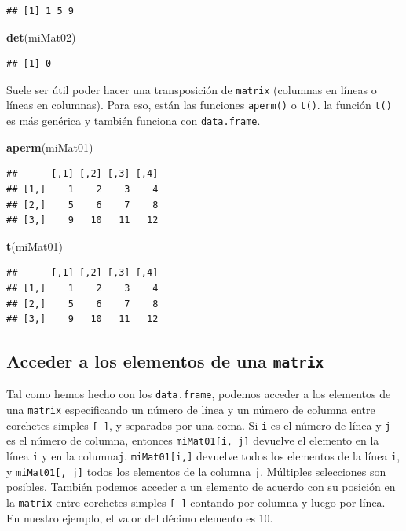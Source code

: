 \documentclass[]{book}
\newenvironment{Shaded}{\begin{snugshade}}{\end{snugshade}}
\newcommand{\KeywordTok}[1]{\textcolor[rgb]{0.13,0.29,0.53}{\textbf{#1}}}
\newcommand{\NormalTok}[1]{#1}
\begin{document}
\begin{verbatim}
## [1] 1 5 9
\end{verbatim}

\begin{Shaded}
\begin{Highlighting}[]
\KeywordTok{det}\NormalTok{(miMat02)}
\end{Highlighting}
\end{Shaded}

\begin{verbatim}
## [1] 0
\end{verbatim}

Suele ser útil poder hacer una transposición de \texttt{matrix}
(columnas en líneas o líneas en columnas). Para eso, están las funciones
\texttt{aperm()} o \texttt{t()}. la función \texttt{t()} es más genérica
y también funciona con \texttt{data.frame}.

\begin{Shaded}
\begin{Highlighting}[]
\KeywordTok{aperm}\NormalTok{(miMat01)}
\end{Highlighting}
\end{Shaded}

\begin{verbatim}
##      [,1] [,2] [,3] [,4]
## [1,]    1    2    3    4
## [2,]    5    6    7    8
## [3,]    9   10   11   12
\end{verbatim}

\begin{Shaded}
\begin{Highlighting}[]
\KeywordTok{t}\NormalTok{(miMat01)}
\end{Highlighting}
\end{Shaded}

\begin{verbatim}
##      [,1] [,2] [,3] [,4]
## [1,]    1    2    3    4
## [2,]    5    6    7    8
## [3,]    9   10   11   12
\end{verbatim}

\subsection{\texorpdfstring{Acceder a los elementos de una
\texttt{matrix}}{Acceder a los elementos de una matrix}}\label{acceder-a-los-elementos-de-una-matrix}

Tal como hemos hecho con los \texttt{data.frame}, podemos acceder a los
elementos de una \texttt{matrix} especificando un número de línea y un
número de columna entre corchetes simples \texttt{{[}\ {]}}, y separados
por una coma. Si \texttt{i} es el número de línea y \texttt{j} es el
número de columna, entonces \texttt{miMat01{[}i,\ j{]}} devuelve el
elemento en la línea \texttt{i} y en la columna\texttt{j}.
\texttt{miMat01{[}i,{]}} devuelve todos los elementos de la línea
\texttt{i}, y \texttt{miMat01{[},\ j{]}} todos los elementos de la
columna \texttt{j}. Múltiples selecciones son posibles. También podemos
acceder a un elemento de acuerdo con su posición en la \texttt{matrix}
entre corchetes simples \texttt{{[}\ {]}} contando por columna y luego
por línea. En nuestro ejemplo, el valor del décimo elemento es 10.
\end{document}

